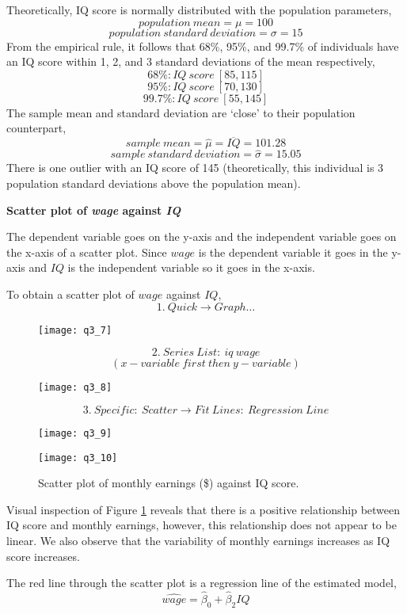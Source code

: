 \documentclass[12pt]{report}
\begin{document}
\noindent Theoretically, IQ score is normally distributed with the population parameters,
$$population\ mean = \mu = 100$$
$$population\ standard\ deviation = \sigma = 15$$
\noindent From the empirical rule, it follows that 68\%, 95\%, and 99.7\% of individuals have an IQ score within 1, 2, and 3 standard deviations of the mean respectively,
$$68\%: IQ\ score\ [85,115]$$
$$95\%: IQ\ score\ [70,130]$$
$$99.7\%: IQ\ score\ [55,145]$$
\noindent The sample mean and standard deviation are ‘close’ to their population counterpart,
$$sample\ mean = \hat{\mu} = \overline{IQ} = 101.28$$
$$sample\ standard\ deviation = \hat{\sigma} = 15.05$$
\noindent There is one outlier with an IQ score of 145 (theoretically, this individual is 3 population standard deviations above the population mean).
\begin{center}
	\noindent \textbf{Scatter plot of \textit{wage} against \textit{IQ}}
\end{center}
\noindent The dependent variable goes on the y-axis and the independent variable goes on the x-axis of a scatter plot. Since $wage$ is the dependent variable it goes in the y-axis and $IQ$ is the independent variable so it goes in the x-axis.

\noindent To obtain a scatter plot of $wage$ against $IQ$,
$$1.\ Quick \to Graph \dots$$
\begin{figure}[H]
	\centering
	\texttt{[image: q3\_7]}
\end{figure}
\vspace{-\baselineskip}
$$2.\ Series\ List:\ iq\ wage$$
$$(x-variable\ first\ then\ y-variable)$$
\begin{figure}[H]
	\centering
	\texttt{[image: q3\_8]}
\end{figure}
\vspace{-\baselineskip}
$$3.\ Specific:\ Scatter \to Fit\ Lines:\ Regression\ Line$$
\begin{figure}[H]
	\centering
	\texttt{[image: q3\_9]}
\end{figure}
\vspace{-\baselineskip}
\begin{figure}[H]
	\centerline{\texttt{[image: q3\_10]}}
	\caption{Scatter plot of monthly earnings (\$) against IQ score.}
	\label{fig:scat1}
\end{figure}
\vspace{-\baselineskip}
\noindent Visual inspection of Figure \ref{fig:scat1} reveals that there is a positive relationship between IQ score and monthly earnings, however, this relationship does not appear to be linear. We also observe that the variability of monthly earnings increases as IQ score increases. \par
\noindent The red line through the scatter plot is a regression line of the estimated model,
$$\widehat{wage} = \hat{\beta}_0 + \hat{\beta}_2IQ$$
\end{document}
